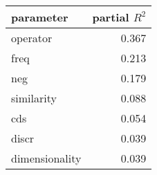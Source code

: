 \begin{tabular}{lr}
\toprule
      parameter &  partial $R^2$ \\
\midrule
       operator &  0.367 \\
           freq &  0.213 \\
            neg &  0.179 \\
     similarity &  0.088 \\
            cds &  0.054 \\
          discr &  0.039 \\
 dimensionality &  0.039 \\
\bottomrule
\end{tabular}
